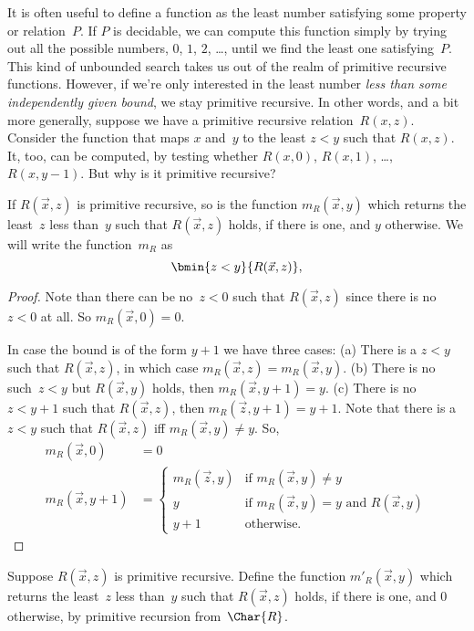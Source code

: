 \documentclass[../../../include/open-logic-section]{subfiles}
\begin{document}

\begin{explain}
It is often useful to define a function as the least number satisfying
some property or relation~$P$. If $P$ is decidable, we can compute
this function simply by trying out all the possible numbers, $0$, $1$,
$2$, \dots, until we find the least one satisfying~$P$.  This kind of
unbounded search takes us out of the realm of primitive recursive
functions. However, if we're only interested in the least number
\emph{less than some independently given bound}, we stay primitive
recursive. In other words, and a bit more generally, suppose we have a
primitive recursive relation~$R(x,z)$. Consider the function that maps
$x$ and~$y$ to the least $z < y$ such that $R(x, z)$. It, too, can be
computed, by testing whether $R(x, 0)$, $R(x, 1)$, \dots, $R(x, y-1)$.
But why is it primitive recursive?
\end{explain}

\begin{prop}
If $R(\vec x, z)$ is primitive recursive, so is the function
$m_R(\vec{x}, y)$ which returns the least~$z$ less than~$y$ such that
$R(\vec x, z)$ holds, if there is one, and $y$ otherwise.  We will
write the function~$m_R$ as
\[
\bmin{z < y}{R(\vec{x}, z)},
\]
\end{prop}

\begin{proof}
Note than there can be no~$z < 0$ such that $R(\vec{x}, z)$ since
there is no $z < 0$ at all.  So $m_R(\vec x, 0) = 0$.

In case the bound is of the form $y + 1$ we have three cases: (a)
There is a $z < y$ such that $R(\vec{x}, z)$, in which case
$m_R(\vec{x}, z) = m_R(\vec{x}, y)$. (b) There is no such~$z<y$ but
$R(\vec{x}, y)$ holds, then $m_R(\vec x, y+1) = y$. (c) There is no $z
< y+1$ such that $R(\vec{x}, z)$, then $m_R(\vec{z}, y+1) = y+1$.
Note that there is a $z<y$ such that $R(\vec x, z)$ iff $m_R(\vec x,
y) \neq y$.  So,
\begin{align*}
m_R(\vec{x}, 0) & = 0\\
m_R(\vec{x}, y+1) & =
\begin{cases}
m_R(\vec{z}, y) & \text{if $m_R(\vec x, y) \neq y$}\\
y & \text{if $m_R(\vec x, y) = y$ and $R(\vec{x}, y)$}\\
y+1 & \text{otherwise.}
\end{cases}
\end{align*}
\end{proof}

\begin{prob}
Suppose $R(\vec x, z)$ is primitive recursive. Define the function
$m'_R(\vec{x}, y)$ which returns the least~$z$ less than~$y$ such that
$R(\vec{x}, z)$ holds, if there is one, and $0$ otherwise, by
primitive recursion from~$\Char{R}$.
\end{prob}
\end{document}
